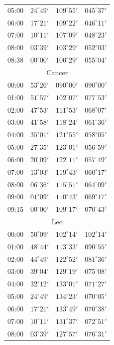 \begin{table}[!h]
\begin{Parallel}{}{}
{{\begin{tabular}{l|lll}
05:00 & $24^\circ 49'$ & $109^\circ 55'$& $045^\circ 37'$ \\
06:00 & $17^\circ 21'$ & $109^\circ 22'$& $046^\circ 11'$ \\
07:00 & $10^\circ 11'$ & $107^\circ 09'$& $048^\circ 23'$ \\
08:00 & $03^\circ 39'$ & $103^\circ 29'$& $052^\circ 03'$ \\
08:38 & $00^\circ 00'$ & $100^\circ 29'$& $055^\circ 04'$ \\
\multicolumn{4}{c}{Cancer}\\
00:00 & $53^\circ 26'$ & $090^\circ 00'$& $090^\circ 00'$ \\
01:00 & $51^\circ 57'$ & $102^\circ 07'$& $077^\circ 53'$ \\
02:00 & $47^\circ 53'$ & $111^\circ 53'$& $068^\circ 07'$ \\
03:00 & $41^\circ 58'$ & $118^\circ 24'$& $061^\circ 36'$ \\
04:00 & $35^\circ 01'$ & $121^\circ 55'$& $058^\circ 05'$ \\
05:00 & $27^\circ 35'$ & $123^\circ 01'$& $056^\circ 59'$ \\
06:00 & $20^\circ 09'$ & $122^\circ 11'$& $057^\circ 49'$ \\
07:00 & $13^\circ 03'$ & $119^\circ 43'$& $060^\circ 17'$ \\
08:00 & $06^\circ 36'$ & $115^\circ 51'$& $064^\circ 09'$ \\
09:00 & $01^\circ 09'$ & $110^\circ 43'$& $069^\circ 17'$ \\
09:15 & $00^\circ 00'$ & $109^\circ 17'$& $070^\circ 43'$ \\
\multicolumn{4}{c}{Leo}\\
00:00 & $50^\circ 09'$ & $102^\circ 14'$& $102^\circ 14'$ \\
01:00 & $48^\circ 44'$ & $113^\circ 33'$& $090^\circ 55'$ \\
02:00 & $44^\circ 49'$ & $122^\circ 52'$& $081^\circ 36'$ \\
03:00 & $39^\circ 04'$ & $129^\circ 19'$& $075^\circ 08'$ \\
04:00 & $32^\circ 12'$ & $133^\circ 01'$& $071^\circ 27'$ \\
05:00 & $24^\circ 49'$ & $134^\circ 23'$& $070^\circ 05'$ \\
06:00 & $17^\circ 21'$ & $133^\circ 49'$& $070^\circ 38'$ \\
07:00 & $10^\circ 11'$ & $131^\circ 37'$& $072^\circ 51'$ \\
08:00 & $03^\circ 39'$ & $127^\circ 57'$& $076^\circ 31'$ \\

\end{tabular}}}
\end{Parallel}
\end{table}

